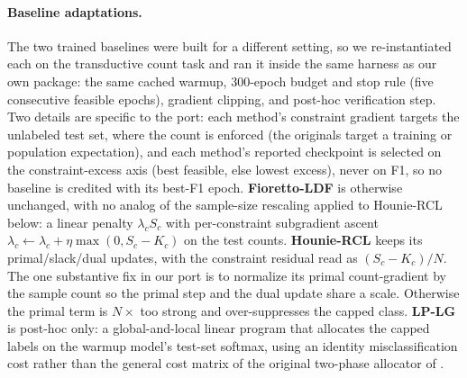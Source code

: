 \documentclass[10pt]{article}
\begin{document}
\paragraph{Baseline adaptations.}
The two trained baselines were built for a different setting, so we
re-instantiated each on the transductive count task and ran it inside the
same harness as our own package: the same cached warmup, $300$-epoch budget
and stop rule (five consecutive feasible epochs), gradient clipping, and
post-hoc verification step. Two details are specific to the port: each
method's constraint gradient targets the unlabeled test set, where the
count is enforced (the originals target a training or population
expectation), and each method's reported checkpoint is selected on the
constraint-excess axis (best feasible, else lowest excess), never on F1, so
no baseline is credited with its best-F1 epoch. \textbf{Fioretto-LDF} is
otherwise unchanged, with no analog of the sample-size rescaling applied to
Hounie-RCL below: a linear penalty $\lambda_c S_c$ with per-constraint
subgradient ascent
$\lambda_c\!\leftarrow\!\lambda_c+\eta\max(0,S_c\!-\!K_c)$ on the test
counts. \textbf{Hounie-RCL} keeps its primal/slack/dual updates, with the
constraint residual read as $(S_c\!-\!K_c)/N$. The one substantive fix in
our port is to normalize its primal count-gradient by the sample count so
the primal step and the dual update share a scale. Otherwise the primal
term is $N\times$ too strong and over-suppresses the capped class.
\textbf{LP-LG} is post-hoc only: a global-and-local linear program that
allocates the capped labels on the warmup model's test-set softmax, using
an identity misclassification cost rather than the general cost matrix
of the original two-phase allocator of
\citet{shifman2025classification}.
\end{document}
